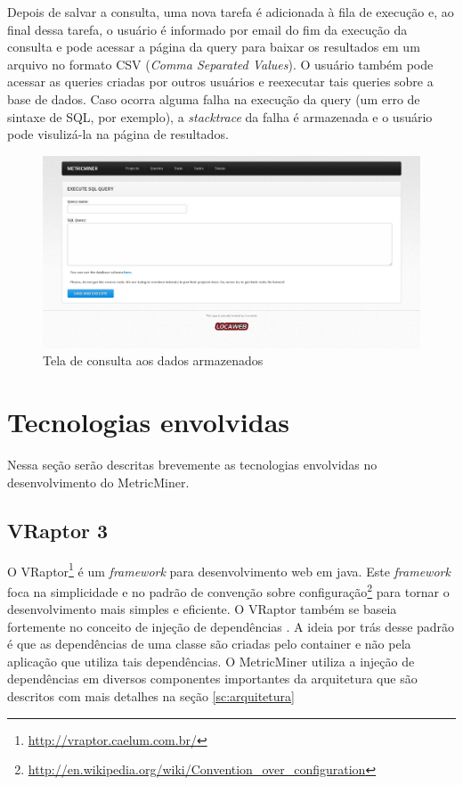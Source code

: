 \documentclass[a4paper, 12pt, twoside]{book}
\begin{document}
        Depois de salvar a consulta, uma nova tarefa é adicionada à fila de execução e, ao final dessa tarefa, o usuário é informado por email do fim da execução da consulta e pode acessar a página da query para baixar os resultados em um arquivo no formato CSV (\textit{Comma Separated Values}). O usuário também pode acessar as queries criadas por outros usuários e reexecutar tais queries sobre a base de dados. Caso ocorra alguma falha na execução da query (um erro de sintaxe de SQL, por exemplo), a \textit{stacktrace} da falha é armazenada e o usuário pode visulizá-la na página de resultados.

        \begin{figure}[ht]
            \centering
            \includegraphics[width=1.00\textwidth]{img/query.png}
            \caption{Tela de consulta aos dados armazenados}
            \label{fig:screen_query}
        \end{figure}
        \clearpage

    \section{Tecnologias envolvidas} \label{sc:tecnologias}

        Nessa seção serão descritas brevemente as tecnologias envolvidas no desenvolvimento do MetricMiner.

        \subsection*{VRaptor 3}
            O VRaptor\footnote{\url{http://vraptor.caelum.com.br/}} é um \textit{framework} para desenvolvimento web em java. Este \textit{framework} foca na simplicidade e no padrão de convenção sobre configuração\footnote{\url{http://en.wikipedia.org/wiki/Convention_over_configuration}} para tornar o desenvolvimento mais simples e eficiente. O VRaptor também se baseia fortemente no conceito de injeção de dependências \cite{fowlerdi}. A ideia por trás desse padrão é que as dependências de uma classe são criadas pelo container e não pela aplicação que utiliza tais dependências. O MetricMiner utiliza a injeção de dependências em diversos componentes importantes da arquitetura que são descritos com mais detalhes na seção \ref{sc:arquitetura}
\end{document}
